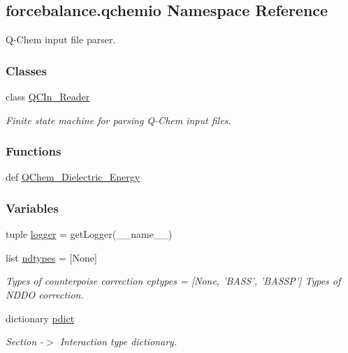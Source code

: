 \hypertarget{namespaceforcebalance_1_1qchemio}{\subsection{forcebalance.\-qchemio Namespace Reference}
\label{namespaceforcebalance_1_1qchemio}
}


Q-\/\-Chem input file parser.  


\subsubsection*{Classes}
\begin{DoxyCompactItemize}
\item 
class \hyperlink{classforcebalance_1_1qchemio_1_1QCIn__Reader}{Q\-C\-In\-\_\-\-Reader}
\begin{DoxyCompactList}\small\item\em Finite state machine for parsing Q-\/\-Chem input files. \end{DoxyCompactList}\end{DoxyCompactItemize}
\subsubsection*{Functions}
\begin{DoxyCompactItemize}
\item 
def \hyperlink{namespaceforcebalance_1_1qchemio_a067c1b4f6695fc5dc20b5de66114bb7f}{Q\-Chem\-\_\-\-Dielectric\-\_\-\-Energy}
\end{DoxyCompactItemize}
\subsubsection*{Variables}
\begin{DoxyCompactItemize}
\item 
tuple \hyperlink{namespaceforcebalance_1_1qchemio_abee44ca4bb20c8230a34484dbfa86bbf}{logger} = get\-Logger(\-\_\-\-\_\-name\-\_\-\-\_\-)
\item 
list \hyperlink{namespaceforcebalance_1_1qchemio_a5c04a6c864770abe6ba25d3e6a5a8119}{ndtypes} = \mbox{[}None\mbox{]}
\begin{DoxyCompactList}\small\item\em Types of counterpoise correction cptypes = \mbox{[}None, 'B\-A\-S\-S', 'B\-A\-S\-S\-P'\mbox{]} Types of N\-D\-D\-O correction. \end{DoxyCompactList}\item 
dictionary \hyperlink{namespaceforcebalance_1_1qchemio_ad9040be76e063b08b49a26ca12295a18}{pdict}
\begin{DoxyCompactList}\small\item\em Section -\/$>$ Interaction type dictionary. \end{DoxyCompactList}\end{DoxyCompactItemize}



